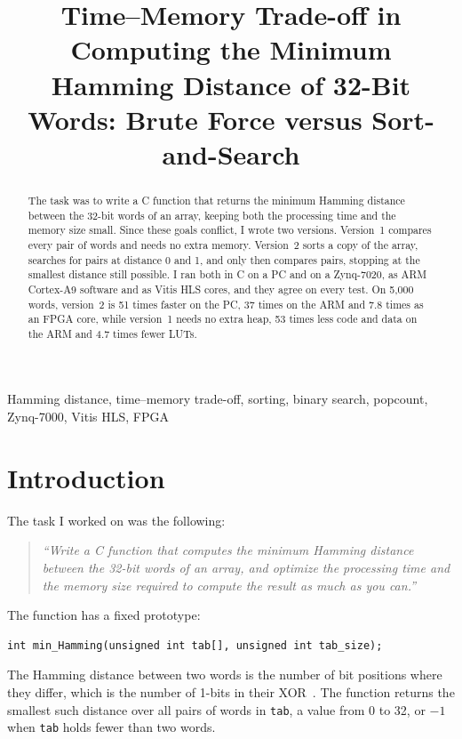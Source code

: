 \documentclass[conference,a4paper]{IEEEtran}
\newcommand{\code}[1]{\texttt{#1}}
\begin{document}
\title{Time--Memory Trade-off in Computing the Minimum Hamming Distance of
32-Bit Words: Brute Force versus Sort-and-Search}

\author{
}

\maketitle

\begin{abstract}
The task was to write a C function that returns the minimum Hamming distance
between the 32-bit words of an array, keeping both the processing time and the
memory size small. Since these goals conflict, I wrote two versions. Version~1
compares every pair of words and needs no extra memory. Version~2 sorts a copy
of the array, searches for pairs at distance 0 and 1, and only then compares
pairs, stopping at the smallest distance still possible. I ran both in C on a PC
and on a Zynq-7020, as ARM Cortex-A9 software and as Vitis HLS cores, and they
agree on every test. On 5,000 words, version~2 is 51 times faster on the PC, 37
times on the ARM and 7.8 times as an FPGA core, while version~1 needs no extra
heap, 53 times less code and data on the ARM and 4.7 times fewer LUTs.
\end{abstract}

\begin{IEEEkeywords}
Hamming distance, time--memory trade-off, sorting, binary search, popcount,
Zynq-7000, Vitis HLS, FPGA
\end{IEEEkeywords}

\section{Introduction}
The task I worked on was the following:
\begin{quote}\itshape
``Write a C function that computes the minimum Hamming distance between the
32-bit words of an array, and optimize the processing time and the memory size
required to compute the result as much as you can.''
\end{quote}
The function has a fixed prototype:
\begin{lstlisting}[numbers=none,frame=none,backgroundcolor={},xleftmargin=0pt,basicstyle=\ttfamily\footnotesize]
int min_Hamming(unsigned int tab[], unsigned int tab_size);
\end{lstlisting}
The Hamming distance between two words is the number of bit positions where
they differ, which is the number of 1-bits in their XOR~\cite{hamming}. The
function returns the smallest such distance over all pairs of words in
\code{tab}, a value from 0 to 32, or $-1$ when \code{tab} holds fewer than two
words.
\end{document}

